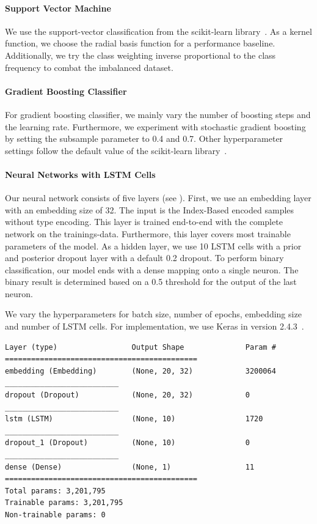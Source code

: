 \paragraph{Support Vector Machine}
We use the support-vector classification from the scikit-learn library~\cite{scikit-learn}. As a kernel function, we choose the radial basis function for a performance baseline. Additionally, we try the class weighting inverse proportional to the class frequency to combat the imbalanced dataset.
\paragraph{Gradient Boosting Classifier}
For gradient boosting classifier, we mainly vary the number of boosting steps and the learning rate. Furthermore, we experiment with stochastic gradient boosting by setting the subsample parameter to 0.4 and 0.7. Other hyperparameter settings follow the default value of the scikit-learn library~\cite{scikit-learn}.
\paragraph{Neural Networks with LSTM Cells}
Our neural network consists of five layers (see ). First, we use an embedding layer with an embedding size of 32. The input is the Index-Based encoded samples without type encoding. This layer is trained end-to-end with the complete network on the trainings-data. Furthermore, this layer covers most trainable parameters of the model. As a hidden layer, we use 10 LSTM cells with a prior and posterior dropout layer with a default 0.2 dropout. To perform binary classification, our model ends with a dense mapping onto a single neuron. The binary result is determined based on a 0.5 threshold for the output of the last neuron.

We vary the hyperparameters for batch size, number of epochs, embedding size and number of LSTM cells. For implementation, we use Keras in version 2.4.3~\cite{chollet2015keras}.

\begin{lstlisting}[label=lst:lstm, caption={Summary of our LSTM network. We use an embedding layer of size 32, 10 LSTM cells, a dropout layer before and after the LSTM layer with a default dropout ratio of 0.2 and a dense mapping to a single output neuron for binary classification with a threshold of 0.5.}]
Layer (type)                 Output Shape              Param #
============================================
embedding (Embedding)        (None, 20, 32)            3200064
__________________________
dropout (Dropout)            (None, 20, 32)            0
__________________________
lstm (LSTM)                  (None, 10)                1720
__________________________
dropout_1 (Dropout)          (None, 10)                0
__________________________
dense (Dense)                (None, 1)                 11
============================================
Total params: 3,201,795
Trainable params: 3,201,795
Non-trainable params: 0\end{lstlisting}